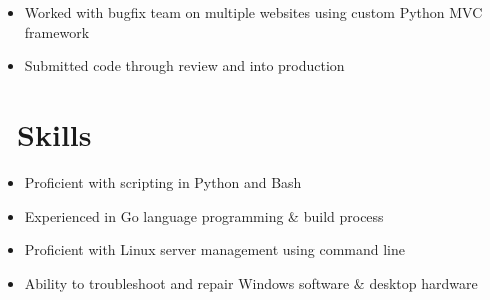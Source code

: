 \documentclass{resume}
\begin{document}
\begin{itemize}
  \item Worked with bugfix team on multiple websites using custom Python MVC framework
  \item Submitted code through review and into production
\end{itemize}

\section{\faCogs\ Skills}
\begin{itemize}[parsep=0.5ex]
  \item Proficient with scripting in Python and Bash
  \item Experienced in Go language programming \& build process
  \item Proficient with Linux server management using command line
  \item Ability to troubleshoot and repair Windows software \& desktop hardware
\end{itemize}
\end{document}
